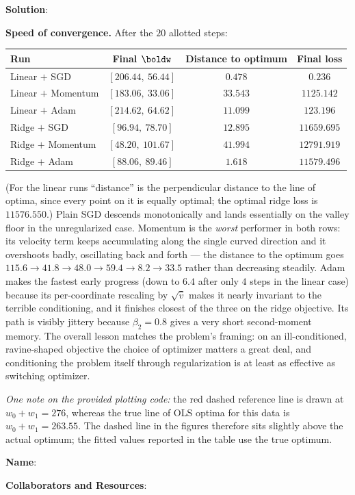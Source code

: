 \documentclass[submit]{../harvardml}
\newenvironment{solution}{
    \vspace{2mm}
    \color{blue}\noindent\textbf{Solution}:
}{}
\begin{document}
\begin{solution}
\begin{enumerate}
\noindent\textbf{Speed of convergence.} After the $20$ allotted steps:
\begin{center}
\begin{tabular}{lccc}
  \hline
  Run & Final $\boldw$ & Distance to optimum & Final loss \\
  \hline
  Linear $+$ SGD      & $[206.44,\ 56.44]$ & $0.478$  & $0.236$ \\
  Linear $+$ Momentum & $[183.06,\ 33.06]$ & $33.543$ & $1125.142$ \\
  Linear $+$ Adam     & $[214.62,\ 64.62]$ & $11.099$ & $123.196$ \\
  \hline
  Ridge $+$ SGD       & $[96.94,\ 78.70]$  & $12.895$ & $11659.695$ \\
  Ridge $+$ Momentum  & $[48.20,\ 101.67]$ & $41.994$ & $12791.919$ \\
  Ridge $+$ Adam      & $[88.06,\ 89.46]$  & $\mathbf{1.618}$ & $\mathbf{11579.496}$ \\
  \hline
\end{tabular}
\end{center}
\noindent (For the linear runs ``distance'' is the perpendicular distance to the line
of optima, since every point on it is equally optimal; the optimal ridge loss is
$11576.550$.) Plain SGD descends monotonically and lands essentially on the valley
floor in the unregularized case. Momentum is the \emph{worst} performer in both rows:
its velocity term keeps accumulating along the single curved direction and it
overshoots badly, oscillating back and forth --- the distance to the optimum goes
$115.6 \to 41.8 \to 48.0 \to 59.4 \to 8.2 \to 33.5$ rather than decreasing steadily.
Adam makes the fastest early progress (down to $6.4$ after only $4$ steps in the linear
case) because its per-coordinate rescaling by $\sqrt{\hat v}$ makes it nearly invariant
to the terrible conditioning, and it finishes closest of the three on the ridge
objective. Its path is visibly jittery because $\beta_2 = 0.8$ gives a very short
second-moment memory. The overall lesson matches the problem's framing: on an
ill-conditioned, ravine-shaped objective the choice of optimizer matters a great deal,
and conditioning the problem itself through regularization is at least as effective as
switching optimizer.

\noindent\emph{One note on the provided plotting code:} the red dashed reference line
is drawn at $w_0 + w_1 = 276$, whereas the true line of OLS optima for this data is
$w_0 + w_1 = 263.55$. The dashed line in the figures therefore sits slightly above the
actual optimum; the fitted values reported in the table use the true optimum.

\end{enumerate}
\end{solution}



\pagebreak
\textbf{Name}:

\textbf{Collaborators and Resources}:
\end{document}
